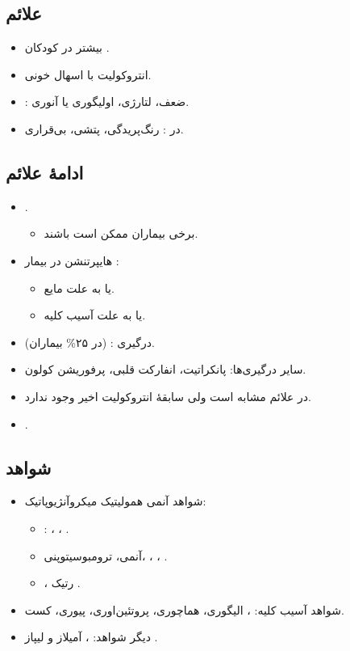\documentclass[12pt,a4paper]{article}
\begin{document}
\subsection*{علائم }
\begin{itemize}
\item بیشتر در کودکان .
\item انتروکولیت با اسهال خونی.
\item {}: ضعف، لتارژی، اولیگوری یا آنوری.
\item در : رنگ‌پریدگی، پتشی، بی‌قراری.
\end{itemize}

\subsection*{ادامهٔ علائم}
\begin{itemize}
\item {}.
  \begin{itemize}
  \item برخی بیماران ممکن است  باشند.
  \end{itemize}
\item هایپرتنشن در بیمار :
  \begin{itemize}
  \item یا به علت  مایع.
  \item یا به علت آسیب کلیه.
  \end{itemize}
\item درگیری :  (در ۲۵\% بیماران).
\item سایر درگیری‌ها: پانکراتیت، انفارکت قلبی، پرفوریشن کولون.
\item در  علائم مشابه است ولی سابقهٔ انتروکولیت اخیر وجود ندارد.
\item {}.
\end{itemize}

\subsection*{شواهد }
\begin{itemize}
\item شواهد آنمی همولیتیک میکروآنژیوپاتیک:
  \begin{itemize}
  \item {}: ، ، .
  \item آنمی، ترومبوسیتوپنی، ، ، .
  \item {}، رتیک \HUSen{$\uparrow$}.
  \end{itemize}
\item شواهد آسیب کلیه: ، الیگوری، هماچوری، پروتئین‌اوری، پیوری، کست.
\item دیگر شواهد: ، آمیلاز و لیپاز \HUSen{$\uparrow$}.
\end{itemize}
\end{document}
